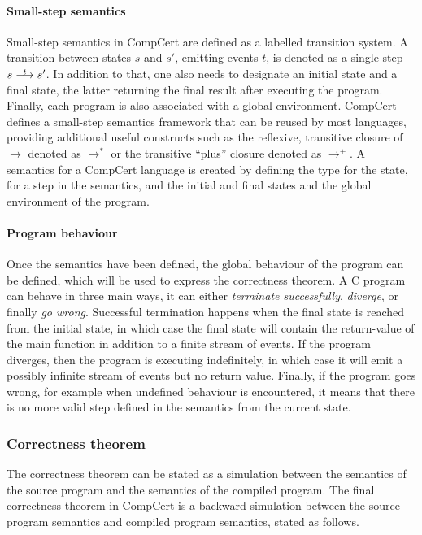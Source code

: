 \paragraph{Small-step semantics}

Small-step semantics in CompCert are defined as a labelled transition system.  A
transition between states $s$ and $s'$, emitting events $t$, is denoted as a
single step $s \oset{t}{\longrightarrow} s'$.  In addition to that, one also
needs to designate an initial state and a final state, the latter returning the
final result after executing the program.  Finally, each program is also
associated with a global environment.  CompCert defines a small-step semantics
framework that can be reused by most languages, providing additional useful
constructs such as the reflexive, transitive closure of $\longrightarrow$
denoted as $\longrightarrow^{*}$ or the transitive \enquote{plus} closure
denoted as $\longrightarrow^{+}$.  A semantics for a CompCert language is
created by defining the type for the state, for a step in the semantics, and the
initial and final states and the global environment of the program.

\paragraph{Program behaviour}

Once the semantics have been defined, the global behaviour of the program can be
defined, which will be used to express the correctness theorem.  A C program can
behave in three main ways, it can either \emph{terminate successfully},
\emph{diverge}, or finally \emph{go wrong}.  Successful termination happens when
the final state is reached from the initial state, in which case the final state
will contain the return-value of the main function in addition to a finite
stream of events.  If the program diverges, then the program is executing
indefinitely, in which case it will emit a possibly infinite stream of events
but no return value.  Finally, if the program goes wrong, for example when
undefined behaviour is encountered, it means that there is no more valid step
defined in the semantics from the current state.

\subsubsection{Correctness theorem}%
\label{sec:bg:correctness-theorem}

The correctness theorem can be stated as a simulation between the semantics of
the source program and the semantics of the compiled program.  The final
correctness theorem in CompCert is a backward simulation between the source
program semantics and compiled program semantics, stated as follows.

